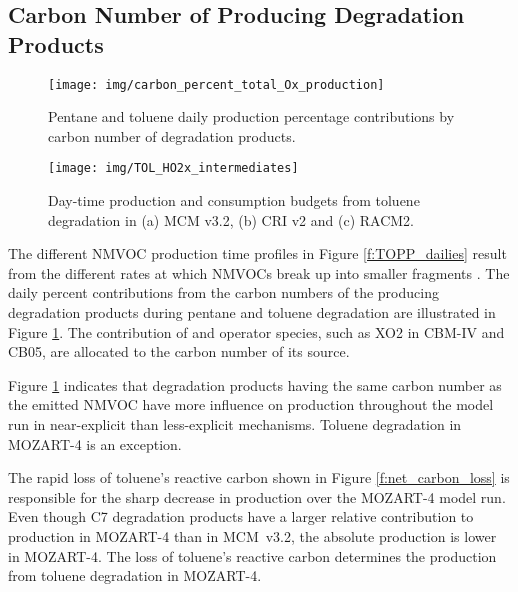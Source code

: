 
\subsection[Carbon Number of Ox Producing Degradation Products]{Carbon Number of  Producing Degradation Products} \label{ss:c_number} %

\begin{figure}
    \centering
    \texttt{[image: img/carbon\_percent\_total\_Ox\_production]}
    \vspace{0mm}
    \caption{Pentane and toluene daily  production percentage contributions by carbon number of degradation products.}
    \vspace{-4mm}
    \label{f:percent_carbon}
\end{figure}

\begin{figure}
    \centering
    \texttt{[image: img/TOL\_HO2x\_intermediates]}
    \vspace{0mm}
    \caption{Day-time  production and consumption budgets from toluene degradation in (a) MCM v3.2, (b) CRI v2 and (c) RACM2.}
    \vspace{-4mm}
    \label{f:toluene_HO2x}
\end{figure} 

The different NMVOC  production time profiles in Figure \ref{f:TOPP_dailies} result from the different rates at which NMVOCs break up into smaller fragments \citep{Butler:2011}.
The daily percent contributions from the carbon numbers of the  producing degradation products during pentane and toluene degradation are illustrated in Figure \ref{f:percent_carbon}.
The contribution of  and operator species, such as XO2 in CBM-IV and CB05, are allocated to the carbon number of its source. 

Figure \ref{f:percent_carbon} indicates that degradation products having the same carbon number as the emitted NMVOC have more influence on  production throughout the model run in near-explicit than less-explicit mechanisms.
Toluene degradation in MOZART-4 is an exception.

The rapid loss of toluene's reactive carbon shown in Figure \ref{f:net_carbon_loss} is responsible for the sharp decrease in  production over the MOZART-4 model run.
Even though C7 degradation products have a larger relative contribution to  production in MOZART-4 than in \mbox{MCM v3.2}, the absolute  production is lower in MOZART-4.
The loss of toluene's reactive carbon determines the  production from toluene degradation in MOZART-4.

